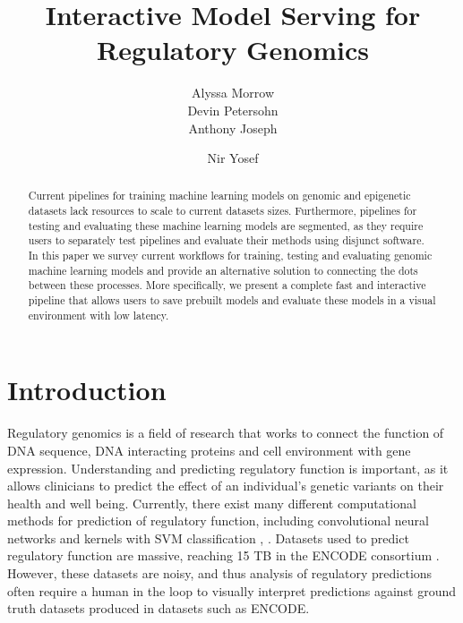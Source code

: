 \documentclass{sig-alternate-05-2015}
\begin{document}
\title{Interactive Model Serving for Regulatory Genomics}



\author{
\alignauthor
Alyssa Morrow \\
\alignauthor
Devin Petersohn \\
\alignauthor Anthony Joseph \\
\and  %
\alignauthor Nir Yosef \\
}

\maketitle
\begin{abstract}
Current pipelines for training machine learning models on genomic and epigenetic datasets lack resources to scale to current datasets sizes. Furthermore, pipelines for testing and evaluating these machine learning models are segmented, as they require users to separately test pipelines and evaluate their methods using disjunct software. In this paper we survey current workflows for training, testing and evaluating genomic machine learning models and provide an alternative solution to connecting the dots between these processes. More specifically, we present a complete fast and interactive pipeline that allows users to save prebuilt models and evaluate these models in a visual environment with low latency.
\end{abstract}


\printccsdesc


\section{Introduction}
Regulatory genomics is a field of research that works to connect the function of DNA sequence, DNA interacting proteins and cell environment with gene expression. Understanding and predicting regulatory function is important, as it allows clinicians to predict the effect of an individual's genetic variants on their health and well being. Currently, there exist many different computational methods for prediction of regulatory function, including convolutional neural networks and kernels with SVM classification \cite{alipanahi2015predicting}, \cite{kelley2016basset}.  Datasets used to predict regulatory function are massive, reaching 15 TB in the ENCODE consortium \cite{encode2004encode}. However, these datasets are noisy, and thus analysis of regulatory predictions often require a human in the loop to visually interpret predictions against ground truth datasets produced in datasets such as ENCODE. \\
\end{document}

